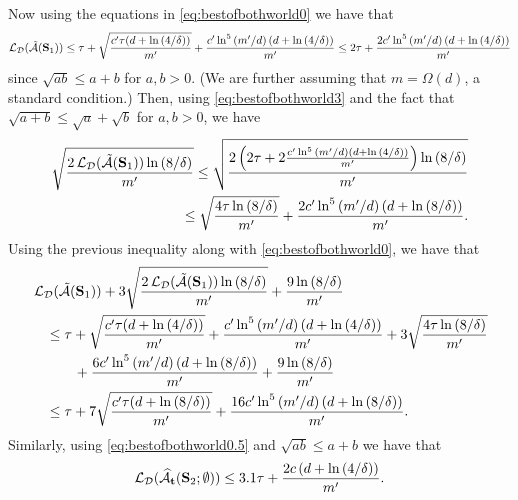 Now using the equations in \cref{eq:bestofbothworld0} we have that 
\begin{align}\label{eq:bestofbothworld3}
\vspace{-1 cm}
    \ls_{\cD}(\tilde{\cA}(\rS_{1}))\leq \tau+\sqrt{\frac{c'\tau(d+\ln{\left(4/\delta \right)})}{m'}}+\frac{c'\ln^{5}{\left( m'/d\right)}\left(d+\ln{\left(4/\delta \right)}      \right)}{m'} 
    \leq 2\tau+\frac{2c'\ln^{5}{\left( m'/d\right)}\left(d+\ln{\left(4/\delta \right)}      \right)}{m'}
\end{align}
since $ \sqrt{ab}\leq a+b $ for $ a,b>0$. (We are further assuming that $m = \Omega(d)$, a standard condition.) Then, using \cref{eq:bestofbothworld3} and the fact that $ \sqrt{a+b}\leq \sqrt{a}+\sqrt{b} $ for $ a,b>0$, we have 
\begin{align*}
 \sqrt{\frac{2\operatorname{\mathcal{L}}_{\mathcal{D}}(\tilde{\mathcal{A}}(\mathbf{S}_{1}))\ln{\left(8/\delta \right)}}{m'}} 
 \leq  \sqrt{\frac{2\left(2\tau+2\frac{c'\ln^{5}{\left( m'/d\right)}\left(d+\ln{\left(4/\delta \right)}      \right)}{m'}\right)\ln{\left(8/\delta \right)}}{m'}}
\\
\leq \sqrt{\frac{4\tau\ln{\left(8/\delta \right)}}{m'}}+
\frac{2c'\ln^{5}{\left( m'/d\right)}\left(d+\ln{\left(8/\delta \right)}      \right)}{m'}. 
\end{align*}
Using the previous inequality along with \cref{eq:bestofbothworld0}, we have that 
\begin{align*}
&\operatorname{\mathcal{L}}_{\mathcal{D}}(\tilde{\mathcal{A}}(\mathbf{S}_{1})) + 3 \sqrt{\frac{2\operatorname{\mathcal{L}}_{\mathcal{D}}(\tilde{\mathcal{A}}(\mathbf{S}_{1}))\ln{(8/\delta )}}{m'}}+\frac{9\ln{(8/\delta )}}{m'}   \\
& \quad \leq  \tau+\sqrt{\frac{c'\tau(d+\ln{\left(4/\delta \right)})}{m'}}+\frac{c'\ln^{5}{\left( m'/d\right)}\left(d+\ln{\left(4/\delta \right)}    \right)}{m'}+ 3 \sqrt{\frac{4\tau\ln{\left(8/\delta \right)}}{m'}} \\
& \qquad \quad  + \frac{6 c'\ln^{5}{\left( m'/d\right)}\left(d+\ln{\left(8/\delta \right)} \right)}{m'} + \frac{9\ln{\left(8/\delta \right)}}{m'} \\
& \quad \leq \tau + 7 \sqrt{\frac{c'\tau(d+\ln{\left(8/\delta \right)})}{m'}}+\frac{16 c'\ln^{5}{\left( m'/d\right)}\left(d+\ln{\left(8/\delta \right)}      \right)}{m'}. 
\end{align*}
Similarly, using \cref{eq:bestofbothworld0.5} and $ \sqrt{ab}\leq a+b $  we have that 
\begin{align*}
    \operatorname{\mathcal{L}}_{\mathcal{D}}(\widehat{\mathcal{A}}_{\mathbf{t}}(\mathbf{S}_{2};\emptyset))\leq  3.1 \tau+\frac{2c\left(d+\ln{\left(4/\delta \right)}\right)}{m'}.
\end{align*}
